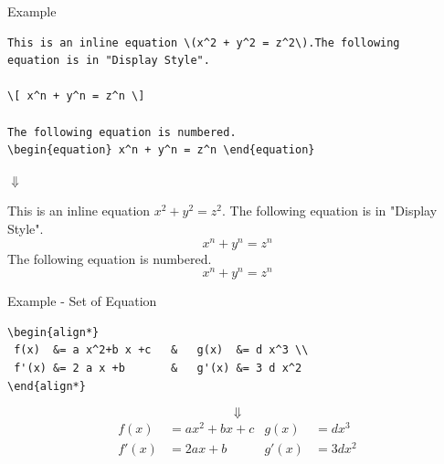 \documentclass[10pt]{beamer}
\begin{document}
\begin{frame}[fragile]{Example}
\begin{verbatim}This is an inline equation \(x^2 + y^2 = z^2\).The following 
equation is in "Display Style".

\[ x^n + y^n = z^n \]

The following equation is numbered.
\begin{equation} x^n + y^n = z^n \end{equation}\end{verbatim}
  \begin{center}$\Downarrow $\end{center}
This is an inline equation \(x^2 + y^2 = z^2\).
The following equation is in "Display Style".
\[ x^n + y^n = z^n \]
The following equation is numbered.
\begin{equation}
 x^n + y^n = z^n
\end{equation}
\end{frame}

\begin{frame}[fragile]{Example - Set of Equation}

\begin{verbatim}\begin{align*}
 f(x)  &= a x^2+b x +c   &   g(x)  &= d x^3 \\
 f'(x) &= 2 a x +b       &   g'(x) &= 3 d x^2
\end{align*}\end{verbatim}
\pause
  $$\Downarrow $$
\begin{align*}
 f(x)  &= a x^2+b x +c   &   g(x)  &= d x^3 \\
 f'(x) &= 2 a x +b       &   g'(x) &= 3 d x^2
\end{align*}
\end{frame}
\end{document}

